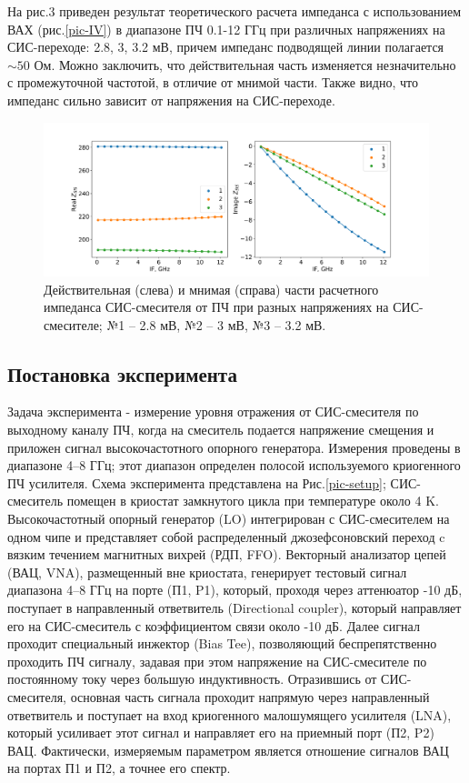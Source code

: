 \documentclass[a4paper]{article}
\begin{document}
На рис.3 приведен результат теоретического расчета импеданса с использованием ВАХ (рис.\ref{pic-IV}) в диапазоне ПЧ 0.1-12 ГГц при различных напряжениях на СИС-переходе: 2.8, 3, 3.2 мВ, 
причем импеданс подводящей линии полагается $\sim 50$ Ом. Можно заключить, что действительная часть изменяется незначительно с промежуточной частотой, в отличие от мнимой части. 
Также видно, что импеданс сильно зависит от напряжения на СИС-переходе.

\begin{figure}[H]
    \begin{center}
        \includegraphics[scale=0.5]{reim.png}
        \caption{Действительная (слева) и мнимая (справа) части расчетного импеданса СИС-смесителя от ПЧ при разных напряжениях на СИС-смесителе; №1 – 2.8 мВ, №2 – 3 мВ, №3 – 3.2 мВ.}
        \label{pic-reim}
    \end{center}
\end{figure}


\subsection{Постановка эксперимента}
Задача эксперимента - измерение уровня отражения от СИС-смесителя по выходному каналу ПЧ, когда на смеситель подается напряжение смещения и приложен сигнал высокочастотного опорного генератора. 
Измерения проведены в диапазоне 4–8 ГГц; этот диапазон определен полосой используемого криогенного ПЧ усилителя. Схема эксперимента представлена на Рис.\ref{pic-setup}; 
СИС-смеситель помещен в криостат замкнутого цикла при температуре около 4 K. Высокочастотный опорный генератор (LO) интегрирован с СИС-смесителем на одном 
чипе и представляет собой распределенный джозефсоновский переход c вязким течением магнитных вихрей (РДП, FFO).  Векторный анализатор цепей (ВАЦ, VNA), 
размещенный вне криостата, генерирует тестовый сигнал диапазона 4–8 ГГц на порте (П1, P1), который, проходя через аттенюатор -10 дБ, поступает в направленный 
ответвитель (Directional coupler), который направляет его на СИС-смеситель с коэффициентом связи около -10 дБ. Далее сигнал проходит специальный инжектор (Bias Tee), 
позволяющий беспрепятственно проходить ПЧ сигналу, задавая при этом напряжение на СИС-смесителе по постоянному току через большую индуктивность. 
Отразившись от СИС-смесителя, основная часть сигнала проходит напрямую через направленный ответвитель и поступает на вход криогенного малошумящего усилителя (LNA), 
который усиливает этот сигнал и направляет его на приемный порт (П2, P2) ВАЦ. Фактически, измеряемым параметром является отношение сигналов ВАЦ на портах П1 и П2, а точнее его спектр.
\end{document}
